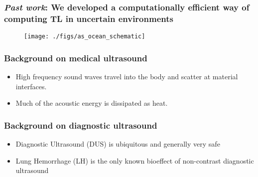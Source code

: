 \begin{frame} \frametitle{\textit{Past work}: We developed a computationally efficient way of computing TL in uncertain environments}
  \begin{figure}\hfill
    \texttt{[image: ./figs/as\_ocean\_schematic]}\hfill
    \hfill
    \hfill
  \end{figure}
  \vspace{-0.7cm}
  \begin{figure}
    \hfill
    \hfill
    \hfill
  \end{figure}
  \vspace{-0.5cm}
  {\footnotesize
  }
\end{frame}
\begin{frame} \frametitle{Background on medical ultrasound}
  \begin{itemize}
    \item High frequency sound waves travel into the body and scatter at material interfaces.
    \item Much of the acoustic energy is dissipated as heat.
  \end{itemize}
\end{frame}
\begin{frame} \frametitle{Background on diagnostic ultrasound}
  \begin{itemize}
    \item Diagnostic Ultrasound (DUS) is ubiquitous and generally very safe
    \item Lung Hemorrhage (LH) is the only known bioeffect of non-contrast diagnostic ultrasound
  \end{itemize}
\end{frame}
